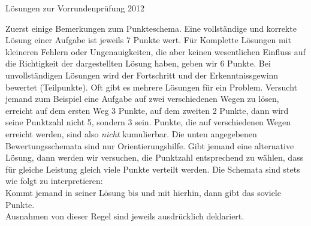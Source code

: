 \documentclass[12pt,a4paper]{article}
\theoremstyle{plain}
\theoremstyle{definition}
\theoremstyle{remark}
\begin{document}
\pagestyle{empty}

\begin{center}
{\huge Lösungen zur Vorrundenprüfung 2012} \\
\end{center}
\vspace{8mm}

Zuerst einige Bemerkungen zum Punkteschema. Eine vollständige und korrekte Lösung einer Aufgabe ist jeweils 7 Punkte wert. Für Komplette Lösungen mit kleineren Fehlern oder Ungenauigkeiten, die aber keinen wesentlichen Einfluss auf die Richtigkeit der dargestellten Lösung haben, geben wir 6 Punkte. Bei unvollständigen Lösungen wird der Fortschritt und der Erkenntnissgewinn bewertet (Teilpunkte). Oft gibt es mehrere Lösungen für ein Problem. Versucht jemand zum Beispiel eine Aufgabe auf zwei verschiedenen Wegen zu lösen, erreicht auf dem ersten Weg 3 Punkte, auf dem zweiten 2 Punkte, dann wird seine Punktzahl nicht 5, sondern 3 sein. Punkte, die auf verschiedenen Wegen erreicht werden, sind also \emph{nicht} kumulierbar. Die unten angegebenen Bewertungsschemata sind nur Orientierungshilfe. Gibt jemand eine alternative Lösung, dann werden wir versuchen, die Punktzahl entsprechend zu wählen, dass für gleiche Leistung gleich viele Punkte verteilt werden. Die Schemata sind stets wie folgt zu interpretieren:\\
Kommt jemand in seiner Lösung bis und mit hierhin, dann gibt das soviele Punkte.\\ 
Ausnahmen von dieser Regel sind jeweils ausdrücklich deklariert.

\vspace{8mm}
\end{document}
